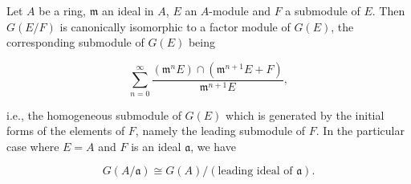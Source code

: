 Let $A$ be a ring, $\mathfrak{m}$ an ideal in $A$, $E$ an $A$-module and $F$ a submodule of $E$. Then $G(E/F)$ is canonically isomorphic to a factor module of $G(E)$, the corresponding submodule of $G(E)$ being

$$\sum_{n=0}^{\infty} \frac{(\mathfrak{m}^n E) \cap (\mathfrak{m}^{n+1} E + F)}{\mathfrak{m}^{n+1} E},$$

i.e., the homogeneous submodule of $G(E)$ which is generated by the initial forms of the elements of $F$, namely the leading submodule of $F$. In the particular case where $E = A$ and $F$ is an ideal $\mathfrak{a}$, we have

$$G(A/\mathfrak{a}) \cong G(A) / (\text{leading ideal of } \mathfrak{a}).$$